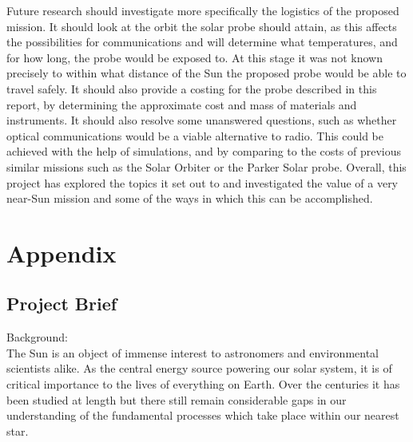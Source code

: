 \documentclass[12pt]{article}
\begin{document}
\vspace{\baselineskip}

Future research should investigate more specifically the logistics of the proposed mission. It should look at the orbit the solar probe should attain, as this affects the possibilities for communications and will determine what temperatures, and for how long, the probe would be exposed to. At this stage it was not known precisely to within what distance of the Sun the proposed probe would be able to travel safely. It should also provide a costing for the probe described in this report, by determining the approximate cost and mass of materials and instruments. It should also resolve some unanswered questions, such as whether optical communications would be a viable alternative to radio. This could be achieved with the help of simulations, and by comparing to the costs of previous similar missions such as the Solar Orbiter or the Parker Solar probe. Overall, this project has explored the topics it set out to and investigated the value of a very near-Sun mission and some of the ways in which this can be accomplished.

\newpage



\printbibliography



\newpage 

\section{Appendix} 
\label{Appendix Section} 

\subsection{Project Brief}
\label{project brief}

Background: \\

The Sun is an object of immense interest to astronomers and environmental scientists alike. As the central energy source powering our solar system, it is of critical importance to the lives of everything on Earth. Over the centuries it has been studied at length but there still remain considerable gaps in our understanding of the fundamental processes which take place within our nearest star. \\
\end{document}
